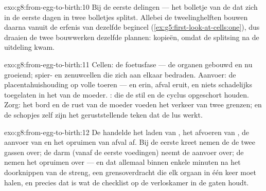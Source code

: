\begin{solution}{exo:g8:from-egg-to-birth:10}
Bij de eerste delingen --- het bolletje van de  dat zich in de
eerste dagen in twee bolletjes splitst. Allebei de tweelinghelften bouwen
daarna vanuit de erfenis van dezelfde begincel
(\cref{ex:g5:first-look-at-cells:one}), dus draaien de twee bouwwerken
dezelfde plannen: kopieën, omdat de splitsing na de uitdeling kwam.
\end{solution}

\begin{solution}{exo:g8:from-egg-to-birth:11}
Cellen: de foetusfase --- de organen gebouwd en nu groeiend; spier- en
zenuwcellen die zich aan elkaar bedraden. Aanvoer: de placentahuishouding
op volle toeren ---  en  erin, afval eruit, en niets
schadelijks toegelaten in het  van de moeder. : die de
 stil en de cyclus opgeschort houden. Zorg: het bord en de rust
van de moeder voeden het verkeer van twee grenzen; en de schopjes zelf
zijn het geruststellende teken dat de lus werkt.
\end{solution}

\begin{solution}{exo:g8:from-egg-to-birth:12}
De  handelde het laden van , het afvoeren van
, de aanvoer van  en het opruimen van afval
af. Bij de eerste kreet nemen de  de twee gassen over; de darm
(vanaf de eerste voedingen) neemt de aanvoer over; de  nemen het
opruimen over --- en dat allemaal binnen enkele minuten na het doorknippen
van de streng, een grensoverdracht die elk orgaan in één keer moet halen,
en precies dat is wat de checklist op de verloskamer in de gaten houdt.
\end{solution}

